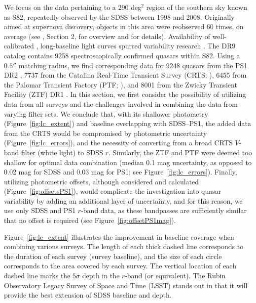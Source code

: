\documentclass[twocolumn]{aastex62}
\begin{document}
We focus on the data pertaining to a 290 deg$^{2}$ region of the southern sky known as S82, repeatedly observed by the SDSS between 1998 and 2008. Originally aimed at supernova discovery, objects in this area were reobserved 60 times, on average (see \citealt{macleod2012}, Section 2, for overview and \citealt{annis2014} for details). Availability of well-calibrated \citep{ivezic2007}, long-baseline light curves spurred variability research \citep{sesar2007}. The DR9 catalog \citep{schneider2008} contains 9258 spectroscopically confirmed quasars within S82. Using a $0.5''$ matching radius, we find corresponding data for 9248 quasars from  the PS1 DR2 \citep{chambers2016,flewelling2018,flewelling2020}, 7737 from the Catalina Real-Time Transient Survey (CRTS; \citealt{drake2009}),  6455 from the Palomar Transient Factory (PTF; \citealt{rau2009}), and 8001 from the Zwicky Transient Facility (ZTF) DR1 \citep{bellm2019,masci2019}. In this section, we first consider the possibility of utilizing data from all surveys and the challenges involved in combining the data from varying filter sets. We conclude that, with its shallower photometry (Figure~\ref{fig:lc_extent}) and baseline overlapping with SDSS--PS1, the added data from the CRTS would be compromised by photometric uncertainty (Figure~\ref{fig:lc_errors}), and the necessity of converting from a broad CRTS $V$-band filter (white light) to SDSS $r$. Similarly, the ZTF and PTF  were deemed too shallow for optimal data combination (median 0.1 mag uncertainty, as opposed to 0.02 mag for SDSS and 0.03 mag for PS1; see Figure~\ref{fig:lc_errors}). Finally, utilizing photometric offsets, although considered and calculated (Figure~\ref{fig:offsetsPS1}), would complicate the investigation into quasar variability by adding an additional  layer of uncertainty, and for this reason, we use only SDSS and PS1 $r$-band data, as these bandpasses are sufficiently similar that no offset is required (see Figure~\ref{fig:offsetPS1mag}).

Figure~\ref{fig:lc_extent} illustrates the improvement in baseline coverage when combining various surveys. The length of each thick dashed line corresponds to the duration of each survey (survey baseline), and the size of each circle corresponds to the area covered by each survey. The vertical location of each dashed line marks the $5\sigma$ depth in the $r$-band (or equivalent). The Rubin Observatory Legacy Survey of Space and Time (LSST) stands out in that it will provide the best extension of SDSS baseline and depth.  
\end{document}
